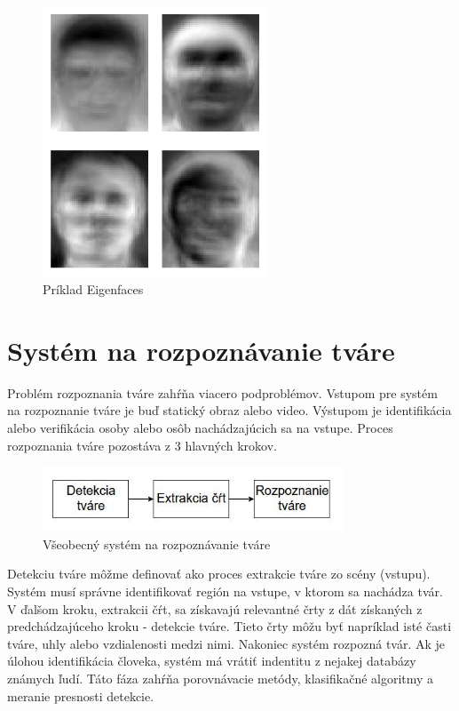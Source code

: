 \begin{figure}[H]
\centerline{\includegraphics[width=0.6\textwidth]{images/Eigenfaces}}
\caption[Eigenfaces]{Príklad Eigenfaces}
\label{obr:Eigenfaces}
\end{figure}

\section{Systém na rozpoznávanie tváre}
Problém rozpoznania tváre zahŕňa viacero podproblémov. 
Vstupom pre systém na rozpoznanie tváre je buď statický obraz alebo video. 
Výstupom je identifikácia alebo verifikácia osoby alebo osôb nachádzajúcich sa na vstupe.
Proces rozpoznania tváre pozostáva z 3 hlavných krokov. 

\begin{figure}[H]
\centerline{\includegraphics[width=0.8\textwidth]{images/3step}}
\caption[Všeobecný systém na rozpoznávanie tváre]{Všeobecný systém na rozpoznávanie tváre}
\label{obr:3step}
\end{figure}

Detekciu tváre môžme definovať ako proces extrakcie tváre zo scény (vstupu). 
Systém musí správne identifikovať región na vstupe, v ktorom sa nachádza tvár.
V ďalšom kroku, extrakcii čŕt, sa získavajú relevantné črty z dát získaných z predchádzajúceho kroku - detekcie tváre.
Tieto črty môžu byť napríklad isté časti tváre, uhly alebo vzdialenosti medzi nimi.
Nakoniec systém rozpozná tvár. 
Ak je úlohou identifikácia človeka, systém má vrátiť indentitu z nejakej databázy známych ľudí. 
Táto fáza zahŕňa porovnávacie metódy, klasifikačné algoritmy a meranie presnosti detekcie.

